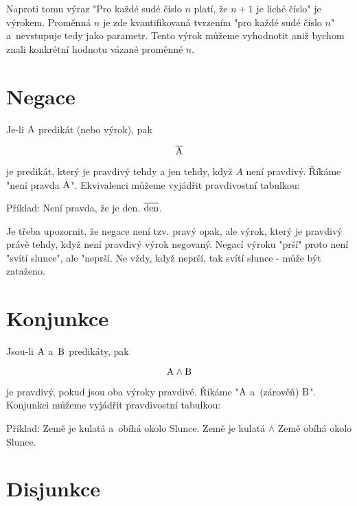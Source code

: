 Naproti tomu výraz "Pro každé sudé číslo \(n\) platí, že \(n + 1\) je liché číslo" je výrokem. Proměnná \(n\) je zde kvantifikovaná tvrzením "pro každé sudé číslo \(n\)" a~nevstupuje tedy jako parametr. Tento výrok můžeme vyhodnotit aniž bychom znali konkrétní hodnotu vázané proměnné \(n\).

\section{Negace}

Je-li \(\mathrm{A}\) predikát (nebo výrok), pak

\begin{equation}
\overline{\mathrm{A}} 
\end{equation}

je predikát, který je pravdivý tehdy a jen tehdy, když \(A\) není pravdivý. Říkáme "není pravda \(\mathrm{A}\)".
Ekvivalenci můžeme vyjádřit pravdivostní tabulkou:


Příklad: Není pravda, že je den. \(\overline{\mathrm{den}}\).

Je třeba upozornit, že negace není tzv. pravý opak, ale výrok, který je pravdivý právě tehdy, když není pravdivý výrok negovaný. Negací výroku "prší" proto není "svítí slunce", ale "neprší. Ne vždy, když neprší, tak svítí slunce - může být zataženo.

\section{Konjunkce}

Jsou-li \(\mathrm{A}\) a~\(\mathrm{B}\) predikáty, pak

\begin{equation}
\mathrm{A} \land \mathrm{B} 
\end{equation}

je pravdivý, pokud jsou oba výroky pravdivé. Říkáme "\(\mathrm{A}\) a~(zárověň) \(\mathrm{B}\)".
Konjunkci můžeme vyjádřit pravdivostní tabulkou:


Příklad: Země je kulatá a~obíhá okolo Slunce. Země je kulatá \(\land\) Země obíhá okolo Slunce.

\section{Disjunkce}

